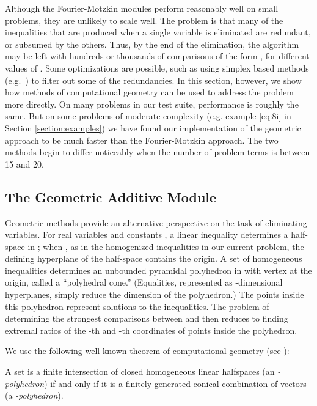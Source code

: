 \documentclass[runningheds]{llncs}
\begin{document}
Although the Fourier-Motzkin modules perform reasonably well on small problems, they are unlikely to scale well. The problem is that many of the inequalities that are produced when a single variable is eliminated are redundant, or subsumed by the others. Thus, by the end of the elimination, the algorithm may be left with hundreds or thousands of comparisons of the form , for different values of . Some optimizations are possible, such as using simplex based methods (e.g.~\cite{dutertre:de:moura:06}) to filter out some of the redundancies. In this section, however, we show how methods of computational geometry can be used to address the problem more directly. On many problems in our test suite, performance is roughly the same. But on some problems of moderate complexity (e.g. example \ref{eq:8i} in Section \ref{section:examples}) we have found our implementation of the geometric approach to be much faster than the Fourier-Motzkin approach. The two methods begin to differ noticeably when the number of problem terms is between 15 and 20. 

\subsection{The Geometric Additive Module}
\label{subsection:additive:geometric}
Geometric methods provide an alternative perspective on the task of
eliminating variables. For real variables  and constants , a linear inequality  determines a half-space in ; when , as in the
homogenized inequalities in our current problem, the defining
hyperplane of the half-space contains the origin. A set of 
homogeneous inequalities determines an unbounded pyramidal polyhedron
in  with vertex at the origin, called a ``polyhedral cone.'' (Equalities, represented as -dimensional hyperplanes, simply reduce the dimension of the polyhedron.) The points inside this polyhedron represent solutions to the inequalities. The problem of determining the strongest comparisons between  and  then reduces to finding extremal ratios of the -th and -th coordinates of points inside the polyhedron.

We use the following well-known theorem of computational geometry (see \cite[Section 1.1]{ziegler:95}):
\begin{theorem}
 A set  is a finite intersection of closed homogeneous linear halfspaces (an \emph{-polyhedron}) if and only if it is a finitely generated conical combination of vectors (a \emph{-polyhedron}).
\end{theorem}
\end{document}
